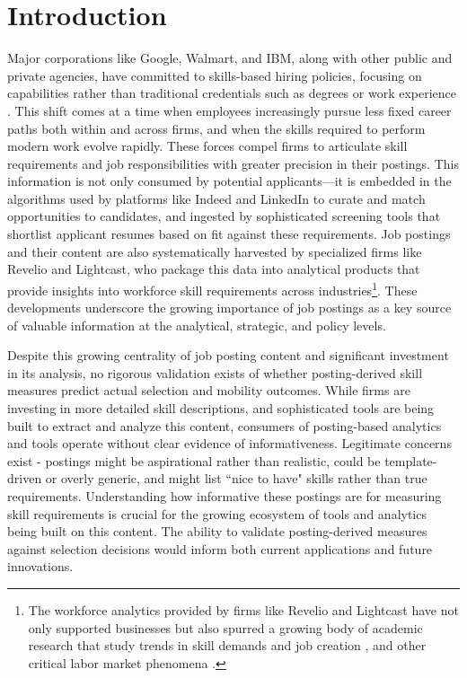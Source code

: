 

\section{Introduction}

Major corporations like Google, Walmart, and IBM, along with other public and private agencies, have committed to 
skills-based hiring policies, focusing on capabilities rather than traditional credentials such as degrees or work 
experience \citep{hbr2022skillsbased, mckinsey2020future, wef2020jobs}. This shift comes at a time when employees 
increasingly pursue less fixed career paths both within and across firms, and when the skills required to perform 
modern work evolve rapidly. These forces compel firms to articulate skill requirements and job responsibilities 
with greater precision in their postings. This information is not only consumed by potential applicants—it is 
embedded in the algorithms used by platforms like Indeed and LinkedIn to curate and match opportunities to 
candidates, and ingested by sophisticated screening tools that shortlist applicant resumes based on fit against 
these requirements. Job postings and their content are also systematically harvested by specialized firms like 
Revelio and Lightcast, who package this data into analytical products that provide insights into workforce skill 
requirements across industries\footnote{The workforce analytics provided by firms like Revelio and Lightcast have 
not only supported businesses but also spurred a growing body of academic research that study trends in skill 
demands and job creation \citep{goldfarb2020artificial, azar2020concentration}, and other critical labor market 
phenomena \citep{hershbein2018recessions, forsythe2020labor, braxton2023technological}.}. These developments 
underscore the growing importance of job postings as a key source of valuable information at the analytical, 
strategic, and policy levels.

Despite this growing centrality of job posting content and significant investment in its analysis, no rigorous validation 
exists of whether posting-derived skill measures predict actual selection and mobility outcomes. While firms are 
investing in more detailed skill descriptions, and sophisticated tools are being built to extract and analyze this content, 
consumers of posting-based analytics and tools operate without clear evidence of informativeness. Legitimate concerns 
exist - postings might be aspirational rather than realistic, could be template-driven or overly generic, and might 
list ``nice to have" skills rather than true requirements. Understanding how informative these postings are for 
measuring skill requirements is crucial for the growing ecosystem of tools and analytics being built on this content. 
The ability to validate posting-derived measures against selection decisions would inform both current applications 
and future innovations.

